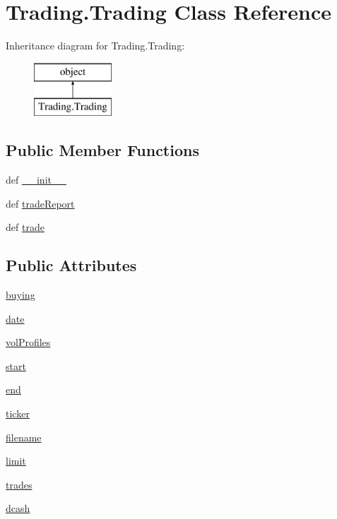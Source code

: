 \hypertarget{class_trading_1_1_trading}{\section{Trading.\-Trading Class Reference}
\label{class_trading_1_1_trading}
}
Inheritance diagram for Trading.\-Trading\-:\begin{figure}[H]
\begin{center}
\leavevmode
\includegraphics[height=2.000000cm]{class_trading_1_1_trading}
\end{center}
\end{figure}
\subsection*{Public Member Functions}
\begin{DoxyCompactItemize}
\item 
def \hyperlink{class_trading_1_1_trading_aafeab56de0fa9d542356af8a1284c114}{\-\_\-\-\_\-init\-\_\-\-\_\-}
\item 
def \hyperlink{class_trading_1_1_trading_a7f06747be641cc521e414b9cdee95b5b}{trade\-Report}
\item 
def \hyperlink{class_trading_1_1_trading_a1d6a8fbf88628c3307fd40b337075b8c}{trade}
\end{DoxyCompactItemize}
\subsection*{Public Attributes}
\begin{DoxyCompactItemize}
\item 
\hyperlink{class_trading_1_1_trading_ab876239e7f29c4462624ed3a74fce105}{buying}
\item 
\hyperlink{class_trading_1_1_trading_a5924d9c6391ed224a0935c6cd0483cbf}{date}
\item 
\hyperlink{class_trading_1_1_trading_aceddec60e3e5fc73596da8fb0a9c847a}{vol\-Profiles}
\item 
\hyperlink{class_trading_1_1_trading_a2637cbc665ef4f9cb899e110d9832f08}{start}
\item 
\hyperlink{class_trading_1_1_trading_aef2277d54f34e88fb02950beb5510bb2}{end}
\item 
\hyperlink{class_trading_1_1_trading_afb27188fcbb7c4e4676e471e6e329d75}{ticker}
\item 
\hyperlink{class_trading_1_1_trading_a06913f18cdfc3247f36d0718783166ef}{filename}
\item 
\hyperlink{class_trading_1_1_trading_a2e65634a069b16b2fb6f143e22792ac8}{limit}
\item 
\hyperlink{class_trading_1_1_trading_a0843b12ca61d641a6f1a3802997160ba}{trades}
\item 
\hyperlink{class_trading_1_1_trading_aef7baa9b87a0f6d4dd33c37f99323f73}{dcash}
\end{DoxyCompactItemize}


